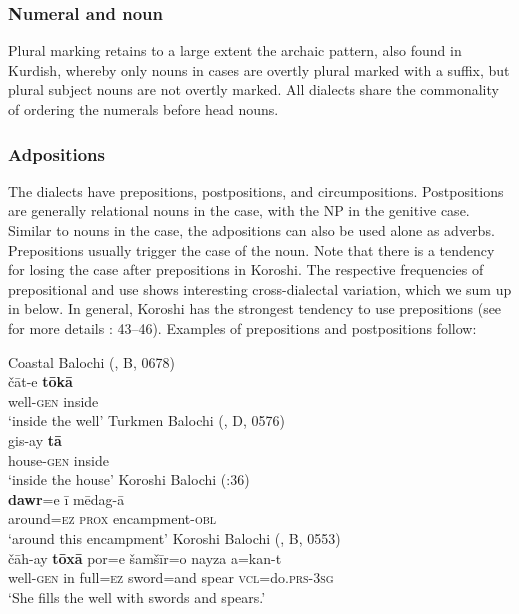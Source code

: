 \documentclass[output=paper,colorlinks,citecolor=brown,draftmode]{langscibook}
\begin{document}
\subsubsection{Numeral and noun}\label{Balochi:ss:3.2.4}

Plural marking retains to a large extent the archaic pattern, also found in Kurdish, whereby only nouns in  cases are overtly plural marked with a suffix, but plural subject nouns are not overtly marked. All dialects share the commonality of ordering the numerals before head nouns. 

\subsubsection{Adpositions}\label{Balochi:ss:3.2.5}

The dialects have prepositions, postpositions, and circumpositions. Postpositions are generally relational nouns in the  case, with the NP  in the genitive case. Similar to nouns in the  case, the adpositions can also be used alone as adverbs. Prepositions usually trigger the  case of the noun. Note that there is a tendency for losing the  case after prepositions in Koroshi. The respective frequencies of prepositional and  use shows interesting cross-dialectal variation, which we sum up in  below. In general, Koroshi has the strongest tendency to use prepositions (see for more details \citealt{nourzaei_koroshi_2015}: 43--46). Examples of prepositions and postpositions follow:

\ea\label{Balochi:ex:7}
\ea\label{Balochi:ex:7a}
Coastal Balochi (\citealt{nourzaei_balochi_coastal_2021}, B, 0678)\\
\gll čāt-e \textbf{tōkā} \\
well-\textsc{gen} inside \\
\glt `inside the well'
\ex\label{Balochi:ex:7b}
Turkmen Balochi (\citealt{haig_balochi_2022}, D, 0576)\\
\gll gis-ay \textbf{tā} \\
house-\textsc{gen} inside \\
\glt `inside the house'
\ex\label{Balochi:ex:7c}
Koroshi Balochi (\citealt{nourzaei_koroshi_2015}:36)\\
\gll \textbf{dawr}=e ī mēdag-ā \\
around=\textsc{ez} \textsc{prox} encampment-\textsc{obl} \\
\glt `around this encampment'
\ex\label{Balochi:ex:7d}
Koroshi Balochi (\citealt{nourzaei_balochi_koroshi_2021}, B, 0553)\\
\gll čāh-ay \textbf{tōxā} por=e šamšīr=o nayza a=kan-t \\
well-\textsc{gen} in full=\textsc{ez} sword=and spear \textsc{vcl}=do.\textsc{prs}-\textsc{3sg} \\
\glt `She fills the well with swords and spears.'
\z
\z
\end{document}
